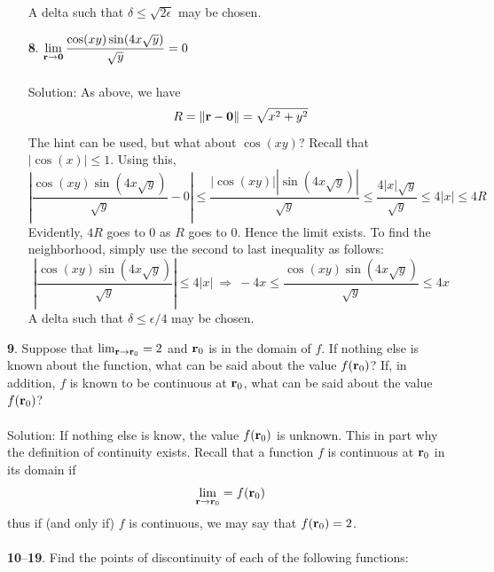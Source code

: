 \documentclass[12pt]{amsbook}
\begin{document}
\begin{enumerate}
A delta such that $\delta \leq \sqrt{2\epsilon}$ may be chosen.
\\
\item[{\small\bf 8}.] $\! \begin{aligned}[t]
\lim_{{\bf r} \rightarrow {\bf 0}}\frac{\cos(xy)\sin(4x\sqrt{y})}{\sqrt{y}}=0
\end{aligned}$ 
\\
\\
{\sc Solution}: As above, we have
$$R=\|{\bf r}-{\bf 0}\|=\sqrt{x^2+y^2}$$
The hint can be used, but what about $\cos(xy)$? Recall that $|\cos(x)|\leq 1$. Using this,
$$|\frac{\cos(xy)\sin(4x\sqrt{y})}{\sqrt{y}}-0|\leq \frac{|\cos(xy)||\sin(4x\sqrt{y})|}{\sqrt{y}}\leq \frac{4|x|\sqrt{y}}{\sqrt{y}}\leq 4|x| \leq 4R$$
Evidently, $4R$ goes to $0$ as $R$ goes to $0$. Hence the limit exists. To find the neighborhood, simply use the second to last inequality as follows:
$$|\frac{\cos(xy)\sin(4x\sqrt{y})}{\sqrt{y}}|\leq 4|x| \ \Rightarrow \ -4x \leq \frac{\cos(xy)\sin(4x\sqrt{y})}{\sqrt{y}} \leq 4x$$
A delta such that $\delta \leq \epsilon/4$ may be chosen.
\\
\end{enumerate}
{\small\bf 9}. Suppose that $\lim_{{\bf r}\rightarrow {\bf r}_0}=2$ and ${\bf r}_0$ is in the domain of $f$. If nothing else is known about the function, what can be said about the value $f({\bf r}_0)$?
If, in addition, $f$ is known to be continuous at ${\bf r}_0$, what can be said about
the value $f({\bf r}_0)$?
\\
\\
{\sc Solution}: If nothing else is know, the value $f({\bf r}_0)$ is unknown. This in part why the definition of continuity exists. Recall that a function $f$ is continuous at ${\bf r}_0$ in its domain if 
$$\lim_{{\bf r}\rightarrow {\bf r}_0}=f({\bf r}_0)$$
thus if (and only if) $f$ is continuous, we may say that $f({\bf r}_0)=2$. 
\\
\\
\noindent
{\small {\bf 10}--{\bf 19}}. Find the points of discontinuity of each of the following functions:
\end{document}
